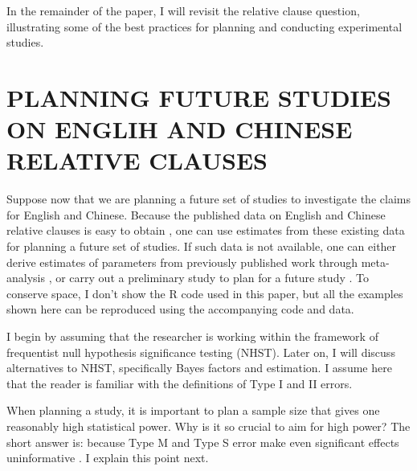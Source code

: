 \documentclass{ar-1col}\usepackage[]{graphicx}\usepackage[]{color}
\begin{document}



In the remainder of the paper, I will revisit the relative clause question, illustrating some of the best practices for planning and conducting experimental studies.

\section{PLANNING FUTURE STUDIES ON ENGLIH AND CHINESE RELATIVE CLAUSES} \label{before}

Suppose now that we are planning a future set of studies to investigate the claims for English and Chinese. Because the published data on English and Chinese relative clauses is easy to obtain \citep[][generously made their data publicly available]{grodner,gibsonwu}, one can use estimates from these existing data for planning a future set of studies. If such data is not available, one can either derive estimates of parameters from previously published work through meta-analysis \citep{VasishthetalPLoSOne2013,mahowald2016meta,JaegerEngelmannVasishth2017,JaegerMertzenVanDykeVasishth2019,NicenboimEtAlBayes2019,BuerkiEtAl2020,Buerki2022,NicenboimRoettgeretal,cox2022bayesian}, or carry out a preliminary study to plan for a future study \citep{NicenboimEtAlCogSci2018}. To conserve space, I don't show the R code used in this paper, but all the examples shown here can be reproduced using the accompanying code and data.

I begin by assuming that the researcher is working within the framework of frequentist null hypothesis significance testing (NHST). Later on, I will discuss alternatives to NHST, specifically Bayes factors and estimation. I assume here that the reader is familiar with the definitions of Type I and II errors.

When planning a study, it is important to plan a sample size that gives one reasonably high statistical power. Why is it so crucial to aim for high power? The short answer is: because Type M and Type S  error make even significant effects uninformative \citep{gelmancarlin}. I explain this point next.
\begin{marginnote}[]
\end{marginnote}
\end{document}
